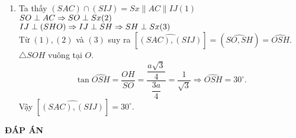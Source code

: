 \begin{bt}
{\begin{enumerate}
	\item Ta thấy $(SAC)\cap (SIJ)=Sx\parallel AC\parallel IJ$\hfill $(1)$\\
	$SO\perp AC\Rightarrow SO\perp Sx\hfill (2)$\\$IJ\perp (SHO)\Rightarrow IJ\perp SH\Rightarrow SH\perp Sx\hfill (3)$\\
	Từ $(1),(2)$ và $(3)$ suy ra $[\widehat{(SAC),(SIJ)}]=(\widehat{SO,SH})=\widehat{OSH}.$\\$\triangle SOH$ vuông tại $O$.$$\tan \widehat{OSH}=\dfrac{OH}{SO}=\dfrac{\dfrac{a\sqrt{3}}{4}}{\dfrac{3a}{4}}=\dfrac{1}{\sqrt{3}}\Rightarrow \widehat{OSH}=30^\circ.$$ Vậy $[\widehat{(SAC),(SIJ)}]=30^\circ.$  
		\end{enumerate}
	
	}
\end{bt}
\newpage
\begin{center}
	\textbf{ĐÁP ÁN}
\end{center}
\begin{multicols}{10}
	
\end{multicols}
